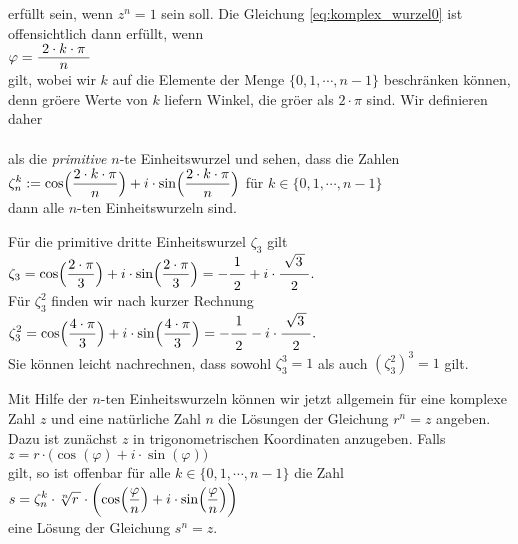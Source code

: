 erf\"{u}llt sein, wenn $z^n = 1$ sein soll.  Die Gleichung \ref{eq:komplex_wurzel0} ist offensichtlich dann
erf\"{u}llt, wenn 
\\[0.2cm]
\hspace*{1.3cm}
$\varphi = \bruch{2 \cdot k \cdot \pi}{n}$
\\[0.2cm]
gilt, wobei wir $k$ auf die Elemente der Menge $\{0,1, \cdots, n-1\}$ beschr\"{a}nken k\"{o}nnen, denn gr\"{o}\3ere
Werte von $k$ liefern Winkel, die gr\"{o}\3er als $2 \cdot \pi$ sind.  Wir definieren daher
\\[0.2cm]
\hspace*{1.3cm}
\colorbox{red}{}
\\[0.2cm]
als die \emph{primitive} $n$-te Einheitswurzel und sehen, dass die Zahlen
\\[0.2cm]
\hspace*{1.3cm}
$\displaystyle\zeta_n^k := \cos\Bigl(\frac{2 \cdot k \cdot \pi}{n}\Bigr) + i \cdot \sin\Bigl(\frac{2 \cdot k \cdot \pi}{n}\Bigr)$
\quad f\"{u}r $k \in \{ 0, 1, \cdots, n-1 \}$
\\[0.2cm]
dann alle $n$-ten Einheitswurzeln sind.

\example
F\"{u}r die primitive dritte Einheitswurzel $\zeta_3$ gilt
\\[0.2cm]
\hspace*{1.3cm}
$\ds\zeta_3 = \cos\Bigl(\frac{2 \cdot \pi}{3}\Bigr) + i \cdot \sin\Bigl(\frac{2 \cdot \pi}{3}\Bigr)
 = - \bruch{1}{2} + i \cdot \bruch{\sqrt{3\,}}{2}. 
$
\\[0.2cm] 
F\"{u}r $\zeta_3^2$ finden wir nach kurzer Rechnung
\\[0.2cm]
\hspace*{1.3cm}
$\ds\zeta_3^2 = \cos\Bigl(\frac{4 \cdot \pi}{3}\Bigr) + i \cdot \sin\Bigl(\frac{4 \cdot \pi}{3}\Bigr)
 = - \bruch{1}{2} - i \cdot \bruch{\sqrt{3\,}}{2}. 
$
\\[0.2cm]
Sie k\"{o}nnen leicht nachrechnen, dass sowohl $\zeta_3^3 = 1$ als auch $(\zeta_3^2)^3 = 1$ gilt.
\vspace*{0.2cm}

Mit Hilfe der $n$-ten Einheitswurzeln k\"{o}nnen wir jetzt allgemein f\"{u}r eine komplexe Zahl $z$ und eine
nat\"{u}rliche Zahl $n$ die L\"{o}sungen der Gleichung $r^n = z$ angeben.  Dazu ist zun\"{a}chst $z$ in
trigonometrischen Koordinaten anzugeben.  Falls
\\[0.2cm]
\hspace*{1.3cm}
$z = r \cdot \bigl(\cos(\varphi) + i \cdot \sin(\varphi)\bigr)$
\\[0.2cm]
gilt, so ist offenbar f\"{u}r alle $k \in \{ 0, 1, \cdots, n - 1 \}$ die Zahl
\\[0.2cm]
\hspace*{1.3cm}
$\displaystyle s = \zeta_n^k \cdot \sqrt[n]{r\,} \cdot 
     \biggl(\cos\Bigl(\frac{\varphi}{n}\Bigr) + i \cdot \sin\Bigl(\frac{\varphi}{n}\Bigr) \biggr)
$
\\[0.2cm] 
eine L\"{o}sung der Gleichung $s^n = z$.

